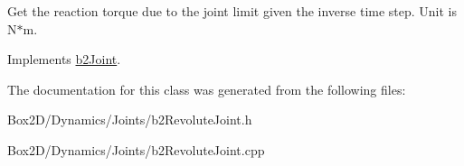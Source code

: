 Get the reaction torque due to the joint limit given the inverse time step. Unit is N$\ast$m. 

Implements \hyperlink{classb2_joint_ae355e441c2aa842777dc04e24f15ced0}{b2\+Joint}.



The documentation for this class was generated from the following files\+:\begin{DoxyCompactItemize}
\item 
Box2\+D/\+Dynamics/\+Joints/b2\+Revolute\+Joint.\+h\item 
Box2\+D/\+Dynamics/\+Joints/b2\+Revolute\+Joint.\+cpp\end{DoxyCompactItemize}
